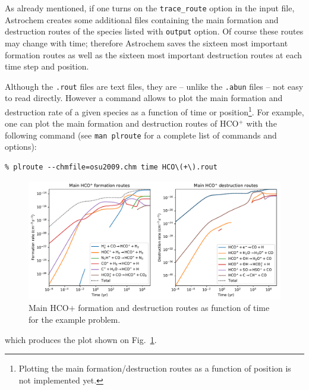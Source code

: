 \documentclass[a4paper,12pt]{article}
\begin{document}
As already mentioned, if one turns on the \verb=trace_route= option
in the input file, Astrochem creates some additional files containing
the main formation and destruction routes of the species listed with
\verb=output= option. Of course these routes may change with time;
therefore Astrochem saves the sixteen most important formation routes
as well as the sixteen most important destruction routes at each time
step and position.

Although the \verb=.rout= files are text files, they are -- unlike
the \verb=.abun= files -- not easy to read directly. However a command
allows to plot the main formation and destruction rate of a given
species as a function of time or position\footnote{Plotting the main
  formation/destruction routes as a function of position is not
  implemented yet.}. For example, one can plot the main formation and
destruction routes of HCO$^{+}$ with the following command (see
\verb=man plroute= for a complete list of commands and options):

\begin{verbatim}
% plroute --chmfile=osu2009.chm time HCO\(+\).rout
\end{verbatim}

\begin{figure}
  \begin{center}
    \includegraphics[width=\columnwidth]{fig2.pdf}
  \end{center}
  \caption{Main HCO${+}$ formation and destruction routes as function
    of time for the example problem.}
  \label{fig:example-routes}
\end{figure}

\noindent
which produces the plot shown on Fig.~\ref{fig:example-routes}.
\end{document}
